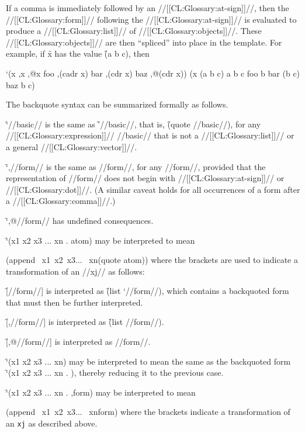 If a comma is immediately followed by an //[[CL:Glossary:at-sign]]//, 
then the //[[CL:Glossary:form]]// following the //[[CL:Glossary:at-sign]]//
is evaluated to produce a //[[CL:Glossary:list]]// of //[[CL:Glossary:objects]]//.
These //[[CL:Glossary:objects]]// are then ``spliced'' into place in the template.  For
example, if \f{x} has the value \f{(a b c)}, then

\code
 `(x ,x ,@x foo ,(cadr x) bar ,(cdr x) baz ,@(cdr x))
\EV (x (a b c) a b c foo b bar (b c) baz b c)
\endcode

The backquote syntax can be summarized formally as follows.

\beginlist
\itemitem{\bull}
\f{`//basic//} is the same as \f{'//basic//},
that is, \f{(quote //basic//)}, for any //[[CL:Glossary:expression]]// 
//basic// that is not a //[[CL:Glossary:list]]// or a general //[[CL:Glossary:vector]]//.


\itemitem{\bull}
\f{`,//form//} is the same as //form//, for any //form//, provided
that the representation of //form// does not begin with //[[CL:Glossary:at-sign]]//
or //[[CL:Glossary:dot]]//.  (A similar caveat holds for all occurrences of a form after a //[[CL:Glossary:comma]]//.)


\itemitem{\bull}
\f{`,@//form//} has undefined consequences.


\itemitem{\bull}
\f{`(x1 x2 x3 ... xn . atom)}
may be interpreted to mean

\code
 (append \lbracket\ x1\rbracket \lbracket\ x2\rbracket \lbracket\ x3\rbracket ... \lbracket\ xn\rbracket (quote atom))
\endcode
where the brackets are used to indicate
a transformation of an //xj// as follows:


\beginlist
\itemitem{--}
\f{[//form//]} is interpreted as \f{(list `//form//)}, 
which contains a backquoted form that must then be further interpreted.


\itemitem{--}
\f{[,//form//]} is interpreted as \f{(list //form//)}.


\itemitem{--}
\f{[,@//form//]} is interpreted as //form//.
\endlist


\itemitem{\bull}
\f{`(x1 x2 x3 ... xn)} may be interpreted to mean
the same as the backquoted form
\f{`(x1 x2 x3 ... xn . \nil)},
thereby reducing it to the previous case.


\itemitem{\bull}
\f{`(x1 x2 x3 ... xn . ,form)} may be interpreted to mean

\code
 (append \lbracket\ x1\rbracket \lbracket\ x2\rbracket \lbracket\ x3\rbracket ... \lbracket\ xn\rbracket form)
\endcode
where the brackets indicate a transformation of an {\tt xj} as described above.


